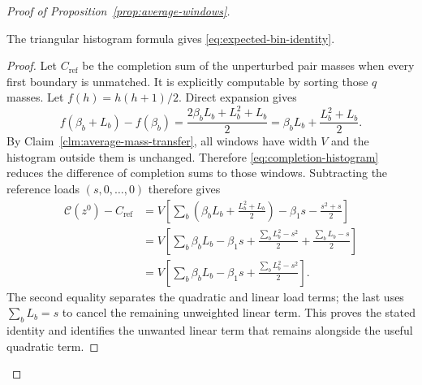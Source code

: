 \begin{proof}[Proof of Proposition~\ref{prop:average-windows}]
\begin{claim}
\label{clm:average-integrated-windows}
The triangular histogram formula gives \eqref{eq:expected-bin-identity}.
\end{claim}
\begin{proof}
Let $C_{\mathrm{ref}}$ be the completion sum of the unperturbed
pair masses when every first boundary is unmatched. It is explicitly
computable by sorting those $q$ masses.
Let $f(h)=h(h+1)/2$. Direct expansion gives
\[
 f(\beta_b+L_b)-f(\beta_b)
 =\frac{2\beta_bL_b+L_b^2+L_b}{2}
 =\beta_bL_b+\frac{L_b^2+L_b}{2}.
\]
By Claim~\ref{clm:average-mass-transfer}, all windows have width
$V$ and the histogram outside them is unchanged. Therefore
\eqref{eq:completion-histogram} reduces the difference of completion
sums to those windows. Subtracting the reference loads $(s,0,\ldots,0)$
therefore gives
\begin{align*}
 \mathcal C(z^0)-C_{\mathrm{ref}}
 &=V\left[\sum_b\left(\beta_bL_b+
                    \frac{L_b^2+L_b}{2}\right)
               -\beta_1s-\frac{s^2+s}{2}\right]\\
 &=V\left[\sum_b\beta_bL_b-\beta_1s
        +\frac{\sum_bL_b^2-s^2}{2}
        +\frac{\sum_bL_b-s}{2}\right]\\
 &=V\left[\sum_b\beta_bL_b-\beta_1s
        +\frac{\sum_bL_b^2-s^2}{2}\right].
\end{align*}
The second equality separates the quadratic and linear load terms;
the last uses $\sum_bL_b=s$ to cancel the remaining unweighted
linear term. This proves the stated
identity and identifies the unwanted linear term that remains
alongside the useful quadratic term.
\end{proof}
\end{proof}

